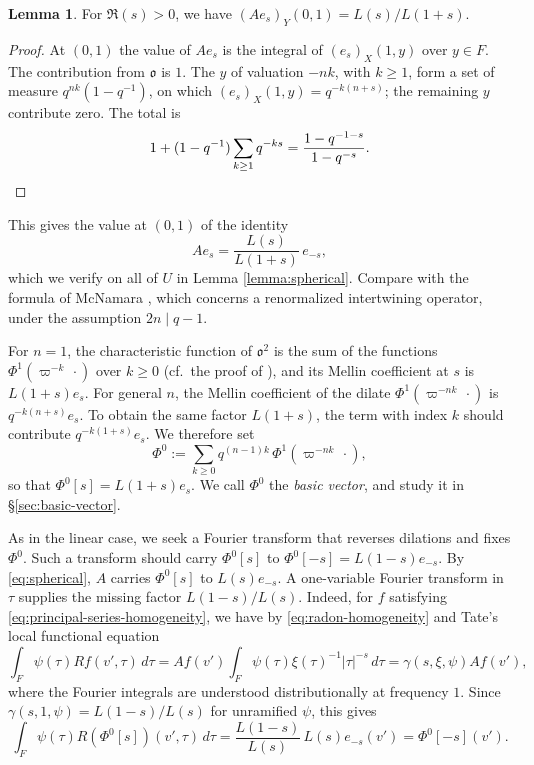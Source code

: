 \documentclass[reqno]{amsart}
\theoremstyle{plain}
\theoremstyle{definition}
\theoremstyle{itplain}
\newtheorem{lemma}[theorem]{Lemma}
\numberwithin{equation}{section}
\numberwithin{theorem}{section}
\begin{document}
\begin{lemma}\label{lemma:spherical-axis}
  For $\Re(s) > 0$, we have $(A e_s)_Y(0, 1) = L(s) / L(1 + s)$.
\end{lemma}
\begin{proof}
  At $(0, 1)$ the value of $A e_s$ is the integral of $(e_s)_X(1, y)$ over $y \in F$.  The contribution from $\mathfrak{o}$ is $1$.  The $y$ of valuation $- n k$, with $k \geq 1$, form a set of measure $q^{n k} (1 - q^{-1})$, on which $(e_s)_X(1, y) = q^{- k (n + s)}$; the remaining $y$ contribute zero.  The total is
  \begin{equation*}
    1 + (1 - q^{-1}) \sum_{k \geq 1} q^{- k s} = \frac{1 - q^{-1-s}}{1 - q^{-s}}. \qedhere
  \end{equation*}
\end{proof}
This gives the value at $(0, 1)$ of the identity
\begin{equation}\label{eq:spherical}
  A e_s = \frac{L(s)}{L(1 + s)} \, e_{-s},
\end{equation}
which we verify on all of $U$ in Lemma \ref{lemma:spherical}.  Compare with the formula of McNamara \cite[Theorem~6]{McNamara2012PrincipalSeries}, which concerns a renormalized intertwining operator, under the assumption $2 n \mid q - 1$.

For $n = 1$, the characteristic function of $\mathfrak{o}^2$ is the sum of the functions $\Phi^1(\varpi^{-k} \, \cdot)$ over $k \geq 0$ (cf.\ the proof of \cite[Theorem~3.13(3)]{MR1694894}), and its Mellin coefficient at $s$ is $L(1 + s) e_s$.  For general $n$, the Mellin coefficient of the dilate $\Phi^1(\varpi^{-n k} \, \cdot)$ is $q^{-k (n + s)} e_s$.  To obtain the same factor $L(1 + s)$, the term with index $k$ should contribute $q^{-k (1 + s)} e_s$.  We therefore set
\begin{equation*}
  \Phi^0 := \sum_{k \geq 0} q^{(n-1) k} \, \Phi^1(\varpi^{- n k} \, \cdot),
\end{equation*}
so that $\Phi^0[s] = L(1 + s) e_s$.  We call $\Phi^0$ the \emph{basic vector}, and study it in \S\ref{sec:basic-vector}.

As in the linear case, we seek a Fourier transform that reverses dilations and fixes $\Phi^0$.  Such a transform should carry $\Phi^0[s]$ to $\Phi^0[-s] = L(1 - s) e_{-s}$.  By \eqref{eq:spherical}, $A$ carries $\Phi^0[s]$ to $L(s) e_{-s}$.  A one-variable Fourier transform in $\tau$ supplies the missing factor $L(1 - s) / L(s)$.  Indeed, for $f$ satisfying \eqref{eq:principal-series-homogeneity}, we have by \eqref{eq:radon-homogeneity} and Tate's local functional equation \cite{MR0217026}
\begin{equation*}
  \int_F \psi(\tau) R f(v', \tau) \, d \tau
  = A f(v') \int_F \psi(\tau) \xi(\tau)^{-1} \lvert \tau \rvert^{-s} \, d \tau
  = \gamma(s, \xi, \psi) A f(v'),
\end{equation*}
where the Fourier integrals are understood distributionally at frequency $1$.  Since $\gamma(s, 1, \psi) = L(1 - s) / L(s)$ for unramified $\psi$, this gives
\begin{equation}\label{eq:cuue7ixq1x}
  \int_F \psi(\tau) R(\Phi^0[s])(v', \tau) \, d \tau
  = \frac{L(1 - s)}{L(s)} \, L(s) e_{-s}(v')
  = \Phi^0[-s](v').
\end{equation}
\end{document}

